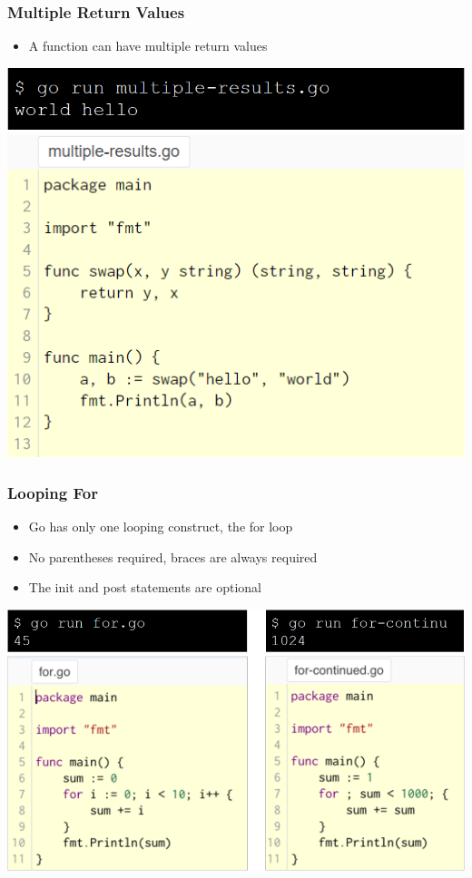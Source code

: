 \documentclass[14pt]{beamer}
\begin{document}
{
\begin{frame}
    \frametitle{Multiple Return Values}
    \begin{itemize}
        \item A function can have multiple return values
    \end{itemize}
    \begin{center}
        \includegraphics[width=0.65\linewidth]{img/multipleresultscommand.PNG}
        \includegraphics[width=0.65\linewidth]{img/multipleresults.PNG}
    \end{center}
\end{frame}
}

{
\begin{frame}
    \frametitle{Looping For}
    \begin{itemize}
        \item Go has only one looping construct, the for loop
        \item No parentheses required, braces are always required
        \item The init and post statements are optional
    \end{itemize}
    \begin{center}
        \includegraphics[width=0.8\linewidth]{img/for.PNG}
    \end{center}
\end{frame}
}
\end{document}
